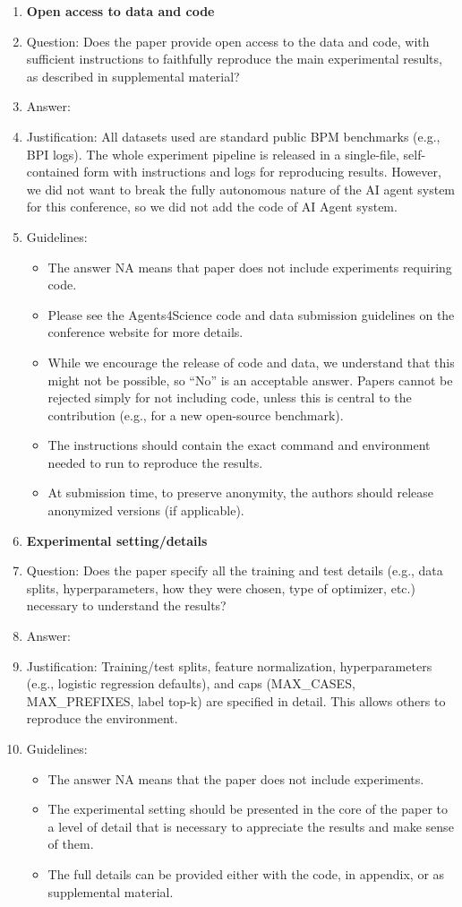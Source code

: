 \documentclass{article}
\theoremstyle{plain}
\theoremstyle{definition}
\theoremstyle{remark}
\begin{document}
\begin{enumerate}
		\item {\bf Open access to data and code}
		\item[] Question: Does the paper provide open access to the data and code, with sufficient instructions to faithfully reproduce the main experimental results, as described in supplemental material?
		\item[] Answer: \answerNo{}
		\item[] Justification: All datasets used are standard public BPM benchmarks (e.g., BPI logs). The whole experiment pipeline is released in a single-file, self-contained form with instructions and logs for reproducing results. However, we did not want to break the fully autonomous nature of the AI agent system for this conference, so we did not add the code of AI Agent system.
		\item[] Guidelines:
		\begin{itemize}
			\item The answer NA means that paper does not include experiments requiring code.
			\item Please see the Agents4Science code and data submission guidelines on the conference website for more details.
			\item While we encourage the release of code and data, we understand that this might not be possible, so “No” is an acceptable answer. Papers cannot be rejected simply for not including code, unless this is central to the contribution (e.g., for a new open-source benchmark).
			\item The instructions should contain the exact command and environment needed to run to reproduce the results. 
			\item At submission time, to preserve anonymity, the authors should release anonymized versions (if applicable).
		\end{itemize}
		
		\item {\bf Experimental setting/details}
		\item[] Question: Does the paper specify all the training and test details (e.g., data splits, hyperparameters, how they were chosen, type of optimizer, etc.) necessary to understand the results?
		\item[] Answer: \answerYes{}
		\item[] Justification: Training/test splits, feature normalization, hyperparameters (e.g., logistic regression defaults), and caps (MAX\_CASES, MAX\_PREFIXES, label top-k) are specified in detail. This allows others to reproduce the environment.
		\item[] Guidelines:
		\begin{itemize}
			\item The answer NA means that the paper does not include experiments.
			\item The experimental setting should be presented in the core of the paper to a level of detail that is necessary to appreciate the results and make sense of them.
			\item The full details can be provided either with the code, in appendix, or as supplemental material.
		\end{itemize}
		

\end{enumerate}
\end{document}
